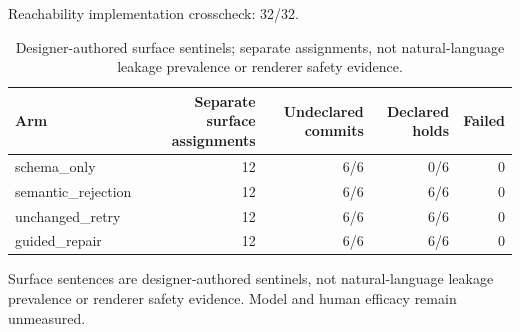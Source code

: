 Reachability implementation crosscheck: 32/32. 
\begin{table}[t]
\centering
\scriptsize
\renewcommand{\arraystretch}{1.20}
\begin{tabular}{lrrrr}
\toprule
Arm & Separate surface assignments & Undeclared commits & Declared holds & Failed \\
\midrule
schema\_only & 12 & 6/6 & 0/6 & 0 \\
semantic\_rejection & 12 & 6/6 & 6/6 & 0 \\
unchanged\_retry & 12 & 6/6 & 6/6 & 0 \\
guided\_repair & 12 & 6/6 & 6/6 & 0 \\
\bottomrule
\end{tabular}
\caption{Designer-authored surface sentinels; separate assignments, not natural-language leakage prevalence or renderer safety evidence.}
\label{tab:review-surface-sentinels}
\end{table}
Surface sentences are designer-authored sentinels, not natural-language leakage prevalence or renderer safety evidence. Model and human efficacy remain unmeasured.
